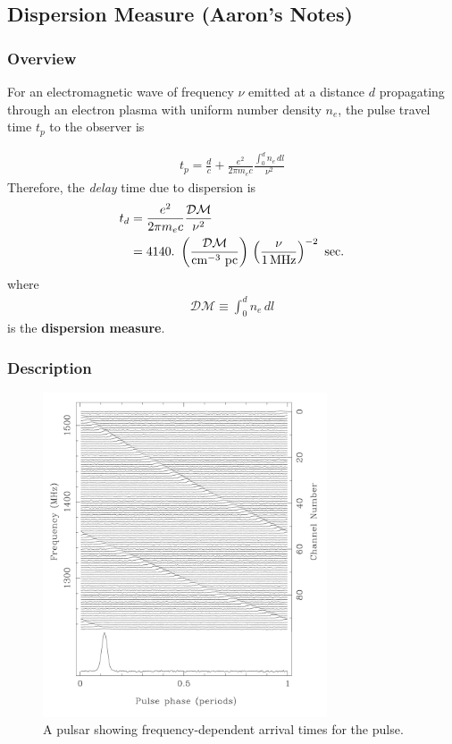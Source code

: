 \documentclass{article}
\begin{document}
\subsection{Dispersion Measure (Aaron's Notes)}

\subsubsection{Overview}

For an electromagnetic wave of frequency $\nu$ emitted at a distance $d$ propagating through an electron plasma with uniform number density $n_e$, the pulse travel time $t_p$ to the observer is

\begin{align}
t_p = \frac{d}{c}+\frac{e^2}{2\pi m_ec}\frac{\int_0^d n_e\,dl}{\nu^2}
\end{align}
Therefore, the \textit{delay} time due to dispersion is
\begin{align}
t_d &= \frac{e^2}{2\pi m_ec}\frac{\mathcal{DM}}{\nu^2}\\
&= 4140.\,\,\left(\frac{\mathcal{DM}}{{\rm cm}^{-3}\,\,{\rm pc}}\right)\,\left(\frac{\nu}{1\,{\rm MHz}}\right)^{-2}\,\,{\rm sec.}
\end{align}
where
\begin{align}
\boxed{\mathcal{DM}\equiv \int_0^d n_e\,dl}
\end{align}
is the \textbf{dispersion measure}.

\subsubsection{Description}

\begin{figure}
    \centering
    \includegraphics[width=0.75\textwidth]{Pulsar_dm.png}
    \caption{A pulsar showing frequency-dependent arrival times for the pulse.}
    \label{fig:dispmeasure}
\end{figure}
\end{document}
